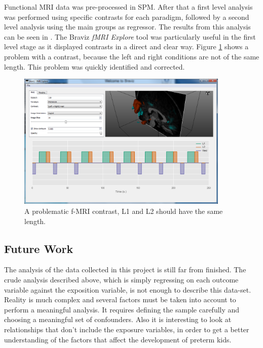 Functional MRI data was pre-processed in SPM.  After that a first level analysis was performed using specific contrasts for each paradigm, followed by a second level analysis using the main groups as regressor. The results from this analysis can be seen in \autocite{uriza_reporte_2015}. The Braviz \emph{fMRI Explore} tool was particularly useful in the first level stage as it displayed contrasts in a direct and clear way. Figure \ref{fig_spm_contrast_error} shows a problem with a contrast, because the left and right conditions are not of the same length. This problem was quickly identified and corrected.

\begin{figure}
	\centering
		\includegraphics[width=0.9\textwidth]{figures/kmc400/erroro_fmri2}
	\caption{A problematic f-MRI contrast, L1 and L2 should have the same length.}
	\label{fig_spm_contrast_error}
\end{figure}
 

\subsection{Future Work}

The analysis of the data collected in this project is still far from finished. The crude analysis described above, which is simply regressing on each outcome variable against the exposition variable, is not enough to describe this data-set. Reality is much complex and several factors must be taken into account to perform a meaningful analysis. It requires defining the sample carefully and choosing a meaningful set of confounders. Also it is interesting to look at relationships that don't include the exposure variables, in order to get a better understanding of the factors that affect the development of preterm kids. 

